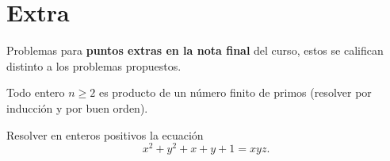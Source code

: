 \section{Extra}

Problemas para \textbf{puntos extras en la nota final} del curso, estos se califican distinto a los problemas propuestos.

\begin{problem}
    Todo entero $n \geq 2$ es producto de un número finito de primos (resolver por inducción y por buen orden).
\end{problem}

\begin{problem}
    Resolver en enteros positivos la ecuación
    \[
        x^2 + y^2 + x + y + 1 = xyz.
    \]
\end{problem}